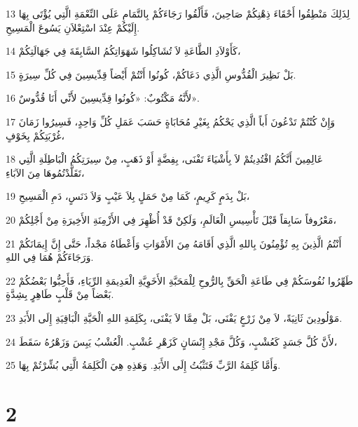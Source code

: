 \par 13 لِذَلِكَ مَنْطِقُوا أَحْقَاءَ ذِهْنِكُمْ صَاحِينَ، فَأَلْقُوا رَجَاءَكُمْ بِالتَّمَامِ عَلَى النِّعْمَةِ الَّتِي يُؤْتَى بِهَا إِلَيْكُمْ عِنْدَ اسْتِعْلاَنِ يَسُوعَ الْمَسِيحِ.
\par 14 كَأَوْلاَدِ الطَّاعَةِ لاَ تُشَاكِلُوا شَهَوَاتِكُمُ السَّابِقَةَ فِي جَهَالَتِكُمْ،
\par 15 بَلْ نَظِيرَ الْقُدُّوسِ الَّذِي دَعَاكُمْ، كُونُوا أَنْتُمْ أَيْضاً قِدِّيسِينَ فِي كُلِّ سِيرَةٍ.
\par 16 لأَنَّهُ مَكْتُوبٌ: «كُونُوا قِدِّيسِينَ لأَنِّي أَنَا قُدُّوسٌ».
\par 17 وَإِنْ كُنْتُمْ تَدْعُونَ أَباً الَّذِي يَحْكُمُ بِغَيْرِ مُحَابَاةٍ حَسَبَ عَمَلِ كُلِّ وَاحِدٍ، فَسِيرُوا زَمَانَ غُرْبَتِكُمْ بِخَوْفٍ،
\par 18 عَالِمِينَ أَنَّكُمُ افْتُدِيتُمْ لاَ بِأَشْيَاءَ تَفْنَى، بِفِضَّةٍ أَوْ ذَهَبٍ، مِنْ سِيرَتِكُمُ الْبَاطِلَةِ الَّتِي تَقَلَّدْتُمُوهَا مِنَ الآبَاءِ،
\par 19 بَلْ بِدَمٍ كَرِيمٍ، كَمَا مِنْ حَمَلٍ بِلاَ عَيْبٍ وَلاَ دَنَسٍ، دَمِ الْمَسِيحِ،
\par 20 مَعْرُوفاً سَابِقاً قَبْلَ تَأْسِيسِ الْعَالَمِ، وَلَكِنْ قَدْ أُظْهِرَ فِي الأَزْمِنَةِ الأَخِيرَةِ مِنْ أَجْلِكُمْ،
\par 21 أَنْتُمُ الَّذِينَ بِهِ تُؤْمِنُونَ بِاللهِ الَّذِي أَقَامَهُ مِنَ الأَمْوَاتِ وَأَعْطَاهُ مَجْداً، حَتَّى إِنَّ إِيمَانَكُمْ وَرَجَاءَكُمْ هُمَا فِي اللهِ.
\par 22 طَهِّرُوا نُفُوسَكُمْ فِي طَاعَةِ الْحَقِّ بِالرُّوحِ لِلْمَحَبَّةِ الأَخَوِيَّةِ الْعَدِيمَةِ الرِّيَاءِ، فَأَحِبُّوا بَعْضُكُمْ بَعْضاً مِنْ قَلْبٍ طَاهِرٍ بِشِدَّةٍ.
\par 23 مَوْلُودِينَ ثَانِيَةً، لاَ مِنْ زَرْعٍ يَفْنَى، بَلْ مِمَّا لاَ يَفْنَى، بِكَلِمَةِ اللهِ الْحَيَّةِ الْبَاقِيَةِ إِلَى الأَبَدِ.
\par 24 لأَنَّ كُلَّ جَسَدٍ كَعُشْبٍ، وَكُلَّ مَجْدِ إِنْسَانٍ كَزَهْرِ عُشْبٍ. الْعُشْبُ يَبِسَ وَزَهْرُهُ سَقَطَ،
\par 25 وَأَمَّا كَلِمَةُ الرَّبِّ فَتَثْبُتُ إِلَى الأَبَدِ. وَهَذِهِ هِيَ الْكَلِمَةُ الَّتِي بُشِّرْتُمْ بِهَا.

\chapter{2}

